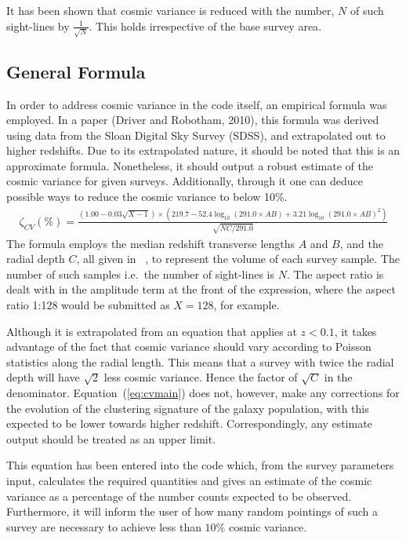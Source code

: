 			It has been shown that cosmic variance is reduced with the number, $N$ of such sight-lines by $\frac{1}{\sqrt{N}}$. This holds irrespective of the base survey area\cite{Driver01102010}.

	\subsection{General Formula} %
	\label{sub:general_formula}
		In order to address cosmic variance in the code itself, an empirical formula was employed. In a paper (Driver and Robotham, 2010), this formula was derived using data from the Sloan Digital Sky Survey (SDSS), and extrapolated out to higher redshifts\cite{Driver01102010}. Due to its extrapolated nature, it should be noted that this is an approximate formula. Nonetheless, it should output a robust estimate of the cosmic variance for given surveys. Additionally, through it one can deduce possible ways to reduce the cosmic variance to below 10\%.
		\begin{align}
			\zeta _{CV}(\%)=\frac{\left( 1.00-0.03\sqrt{X-1} \right)\times \left( 219.7-52.4\log_{10}\left(291.0\times AB \right) + 3.21\log_{10}{\left(291.0\times AB\right)}^{2} \right)}{\sqrt{NC/291.0}} \label{eq:cvmain}
		\end{align}
		The formula employs the median redshift transverse lengths $A$ and $B$, and the radial depth $C$, all given in \si{\mega\parsec}, to represent the volume of each survey sample. The number of such samples i.e.\ the number of sight-lines is $N$. The aspect ratio is dealt with in the amplitude term at the front of the expression, where the aspect ratio 1:128 would be submitted as $X=128$, for example.

		Although it is extrapolated from an equation that applies at $z<0.1$, it takes advantage of the fact that cosmic variance should vary according to Poisson statistics along the radial length. This means that a survey with twice the radial depth will have $\sqrt{2}$ less cosmic variance. Hence the factor of $\sqrt{C}$ in the denominator. Equation~(\ref{eq:cvmain}) does not, however, make any corrections for the evolution of the clustering signature of the galaxy population, with this expected to be lower towards higher redshift. Correspondingly, any estimate output should be treated as an upper limit.

		This equation has been entered into the code which, from the survey parameters input, calculates the required quantities and gives an estimate of the cosmic variance as a percentage of the number counts expected to be observed. Furthermore, it will inform the user of how many random pointings of such a survey are necessary to achieve less than $10\%$ cosmic variance.

